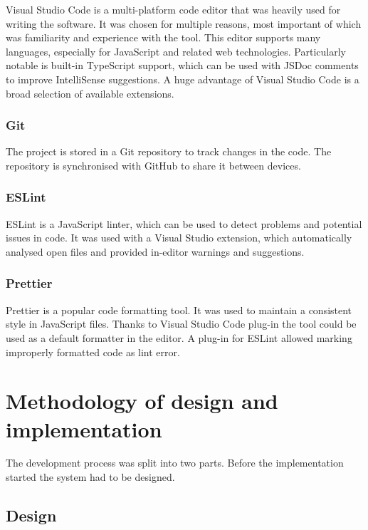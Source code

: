 Visual Studio Code is a multi-platform code editor that was heavily used for writing the software. It was chosen for multiple reasons, most important of which was familiarity and experience with the tool. This editor supports many languages, especially for JavaScript and related web technologies. Particularly notable is built-in TypeScript support, which can be used with JSDoc comments to improve IntelliSense suggestions. A huge advantage of Visual Studio Code is a broad selection of available extensions.

\subsubsection{Git}

The project is stored in a Git repository to track changes in the code. The repository is synchronised with GitHub to share it between devices.

\subsubsection{ESLint}

ESLint is a JavaScript linter, which can be used to detect problems and potential issues in code. It was used with a Visual Studio extension, which automatically analysed open files and provided in-editor warnings and suggestions.

\subsubsection{Prettier}

Prettier is a popular code formatting tool. It was used to maintain a consistent style in JavaScript files. Thanks to Visual Studio Code plug-in the tool could be used as a default formatter in the editor. A plug-in for ESLint allowed marking improperly formatted code as lint error.

\section{Methodology of design and implementation}

The development process was split into two parts. Before the implementation started the system had to be designed.

\subsection{Design}

